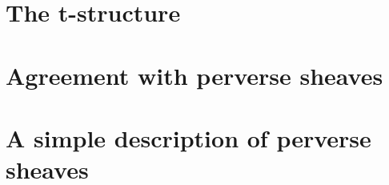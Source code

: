 \documentclass[english]{short-notes}
\begin{document}
\section{The t-structure}



\section{Agreement with perverse sheaves}


\section{A simple description of perverse sheaves}


\printbibliography
\end{document}

